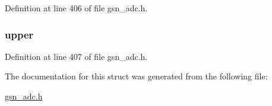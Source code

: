 Definition at line 406 of file gsn\_\-adc.h.

\hypertarget{a00026_ac97de50c6b6dd9e9eb57dbf10c38d4ec}{
\subsubsection[{upper}]{ {\bf upper}}}
\label{a00026_ac97de50c6b6dd9e9eb57dbf10c38d4ec}


Definition at line 407 of file gsn\_\-adc.h.



The documentation for this struct was generated from the following file:\begin{DoxyCompactItemize}
\item 
\hyperlink{a00474}{gsn\_\-adc.h}\end{DoxyCompactItemize}
